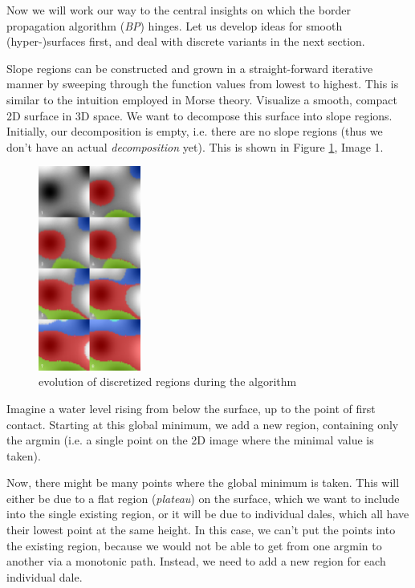 \documentclass[a4paper,10pt,notitlepage,fullpage]{paper}
\theoremstyle{plain}
\theoremstyle{definition}
\begin{document}
Now we will work our way to the central insights on which the border propagation algorithm (\emph{BP}) hinges.
Let us develop ideas for smooth (hyper-)surfaces first, and deal with discrete variants in the next section.

Slope regions can be constructed and grown in a straight-forward iterative manner by sweeping through the function values from lowest to highest. 
This is similar to the intuition employed in Morse theory\cite{MatsumotoYukio2002AitM}.
Visualize a smooth, compact 2D surface in 3D space.
We want to decompose this surface into slope regions.
Initially, our decomposition is empty, i.e. there are no slope regions (thus we don't have an actual \emph{decomposition} yet).
This is shown in Figure \ref{fig:evolution}, Image 1.

\begin{figure}
\centering
\includegraphics[width=0.3\textwidth]{img/slope_evolution.png}
\caption{evolution of discretized regions during the algorithm}
\label{fig:evolution}
\end{figure}

Imagine a water level rising from below the surface, up to the point of first contact.
Starting at this global minimum, we add a new region, containing only the argmin (i.e. a single point on the 2D image where the minimal value is taken).

Now, there might be many points where the global minimum is taken.
This will either be due to a flat region (\emph{plateau}) on the surface, which we want to include into the single existing region, or it will be due to individual dales, which all have their lowest point at the same height.
In this case, we can't put the points into the existing region, because we would not be able to get from one argmin to another via a monotonic path.
Instead, we need to add a new region for each individual dale.
\end{document}
